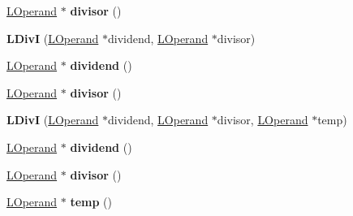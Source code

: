 \begin{DoxyCompactItemize}
\item 
\hyperlink{classv8_1_1internal_1_1_l_operand}{L\+Operand} $\ast$ {\bfseries divisor} ()\hypertarget{classv8_1_1internal_1_1_l_div_i_a5ceb6d1f5a2f1f0c998966e525a2cb3c}{}\label{classv8_1_1internal_1_1_l_div_i_a5ceb6d1f5a2f1f0c998966e525a2cb3c}

\item 
{\bfseries L\+DivI} (\hyperlink{classv8_1_1internal_1_1_l_operand}{L\+Operand} $\ast$dividend, \hyperlink{classv8_1_1internal_1_1_l_operand}{L\+Operand} $\ast$divisor)\hypertarget{classv8_1_1internal_1_1_l_div_i_a749d0ff2a9a8321f7fee1549d65f2fb5}{}\label{classv8_1_1internal_1_1_l_div_i_a749d0ff2a9a8321f7fee1549d65f2fb5}

\item 
\hyperlink{classv8_1_1internal_1_1_l_operand}{L\+Operand} $\ast$ {\bfseries dividend} ()\hypertarget{classv8_1_1internal_1_1_l_div_i_a324dcd2105a5772942591b32a93edf8c}{}\label{classv8_1_1internal_1_1_l_div_i_a324dcd2105a5772942591b32a93edf8c}

\item 
\hyperlink{classv8_1_1internal_1_1_l_operand}{L\+Operand} $\ast$ {\bfseries divisor} ()\hypertarget{classv8_1_1internal_1_1_l_div_i_a5ceb6d1f5a2f1f0c998966e525a2cb3c}{}\label{classv8_1_1internal_1_1_l_div_i_a5ceb6d1f5a2f1f0c998966e525a2cb3c}

\item 
{\bfseries L\+DivI} (\hyperlink{classv8_1_1internal_1_1_l_operand}{L\+Operand} $\ast$dividend, \hyperlink{classv8_1_1internal_1_1_l_operand}{L\+Operand} $\ast$divisor, \hyperlink{classv8_1_1internal_1_1_l_operand}{L\+Operand} $\ast$temp)\hypertarget{classv8_1_1internal_1_1_l_div_i_a2c447a721208972b1aa2bbbdf5ae58c9}{}\label{classv8_1_1internal_1_1_l_div_i_a2c447a721208972b1aa2bbbdf5ae58c9}

\item 
\hyperlink{classv8_1_1internal_1_1_l_operand}{L\+Operand} $\ast$ {\bfseries dividend} ()\hypertarget{classv8_1_1internal_1_1_l_div_i_a324dcd2105a5772942591b32a93edf8c}{}\label{classv8_1_1internal_1_1_l_div_i_a324dcd2105a5772942591b32a93edf8c}

\item 
\hyperlink{classv8_1_1internal_1_1_l_operand}{L\+Operand} $\ast$ {\bfseries divisor} ()\hypertarget{classv8_1_1internal_1_1_l_div_i_a5ceb6d1f5a2f1f0c998966e525a2cb3c}{}\label{classv8_1_1internal_1_1_l_div_i_a5ceb6d1f5a2f1f0c998966e525a2cb3c}

\item 
\hyperlink{classv8_1_1internal_1_1_l_operand}{L\+Operand} $\ast$ {\bfseries temp} ()\hypertarget{classv8_1_1internal_1_1_l_div_i_ab28d8d7ab78227bb8dcc89a205a7c7be}{}\label{classv8_1_1internal_1_1_l_div_i_ab28d8d7ab78227bb8dcc89a205a7c7be}


\end{DoxyCompactItemize}
